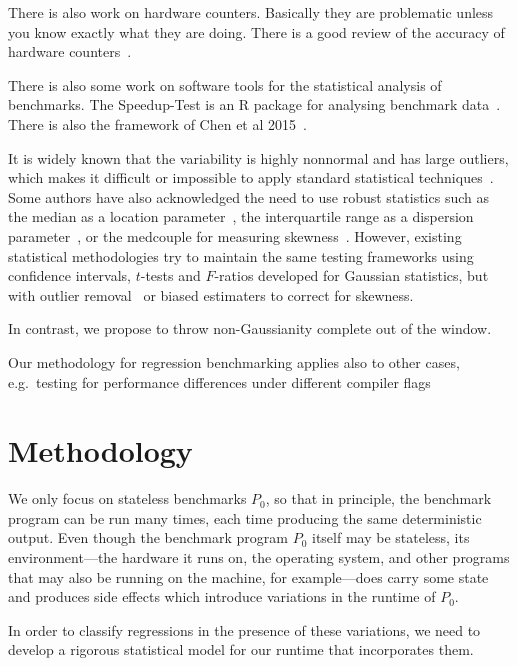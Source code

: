 \documentclass[conference]{IEEEtran}
\begin{document}
There is also work on hardware counters. Basically they are problematic unless you know exactly what they are doing. There is a good review of the accuracy of hardware counters~\cite{Weaver2013}.

There is also some work on software tools for the statistical analysis of benchmarks. The Speedup-Test is an R package for analysing benchmark data~\cite{Touati2013}. There is also the framework of Chen et al 2015~\cite{Chen2015}.

It is widely known that the variability is highly nonnormal and has large outliers, which makes it difficult or impossible to apply standard statistical techniques~\cite{Mytkowicz2009,Kalibera2013,Chen2015,Barrett2016}. Some authors have also acknowledged the need to use robust statistics such as the median as a location parameter~\cite{Mytkowicz2009}, the interquartile range as a dispersion parameter~\cite{Mytkowicz2009}, or the medcouple for measuring skewness~\cite{Rehn2015}.
However, existing statistical methodologies try to maintain the same testing frameworks using confidence intervals, $t$-tests and $F$-ratios developed for Gaussian statistics, but with outlier removal~\cite{Rehn2015} or biased estimaters to correct for skewness.

In contrast, we propose to throw non-Gaussianity complete out of the window.

Our methodology for regression benchmarking applies also to other cases, e.g.\ testing for performance differences under different compiler flags~\cite{Mytkowicz2009}

\section{Methodology}

We only focus on stateless benchmarks $P_0$, so that in principle, the benchmark program can be run many times, each time producing the same deterministic output. Even though the benchmark program $P_0$ itself may be stateless, its environment---the hardware it runs on, the operating system, and other programs that may also be running on the machine, for example---does carry some state and produces side effects which introduce variations in the runtime of $P_0$.

In order to classify regressions in the presence of these variations, we need to develop a rigorous statistical model for our runtime that incorporates them.
\end{document}
